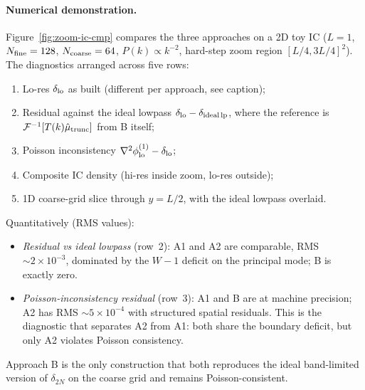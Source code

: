 \documentclass[12pt]{article}
\newcommand{\toyn}{-2}
\begin{document}
\paragraph{Numerical demonstration.}
Figure~\ref{fig:zoom-ic-cmp} compares the three approaches on a 2D
toy IC ($L=1$, $N_{\rm fine}=128$, $N_{\rm coarse}=64$, $P(k)\propto k^{\toyn}$,
hard-step zoom region $[L/4,3L/4]^2$). The diagnostics arranged across
five rows:
\begin{enumerate}
\item Lo-res $\delta_{\rm lo}$ as built (different per approach, see
      caption);
\item Residual against the ideal lowpass
      $\delta_{\rm lo} - \delta_{\rm ideal\,lp}$, where the reference
      is $\mathcal F^{-1}[T(k)\hat\mu_{\rm trunc}]$ from B itself;
\item Poisson inconsistency $\nabla^2\phi^{(1)}_{\rm lo} - \delta_{\rm lo}$;
\item Composite IC density (hi-res inside zoom, lo-res outside);
\item 1D coarse-grid slice through $y=L/2$, with the ideal lowpass
      overlaid.
\end{enumerate}

Quantitatively (RMS values):
\begin{itemize}
\item \emph{Residual vs ideal lowpass} (row~2): A1 and A2 are
      comparable, RMS $\sim 2\times 10^{-3}$, dominated by the
      $W-1$ deficit on the principal mode; B is exactly zero.
\item \emph{Poisson-inconsistency residual} (row~3): A1 and B are
      at machine precision; A2 has RMS $\sim 5\times 10^{-4}$ with
      structured spatial residuals. This is the diagnostic that
      separates A2 from A1: both share the boundary deficit, but
      only A2 violates Poisson consistency.
\end{itemize}
Approach B is the only construction that both reproduces the ideal
band-limited version of $\delta_{2N}$ on the coarse grid and remains
Poisson-consistent.
\end{document}
